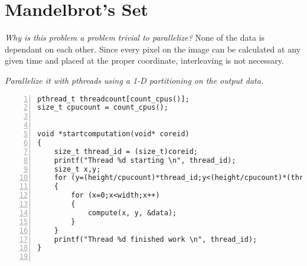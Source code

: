 \documentclass{article}
\begin{document}
\section{Mandelbrot's Set}

\begin{ExerciseList}
\Exercise
{}

\Question \emph{Why is this problem a problem trivial to parallelize?}
\Answer None of the data is dependant on each other. Since every pixel on the image can be calculated at any given time and placed at the proper coordinate, interleaving is not necessary.

\Question \emph{Parallelize it with pthreads using a 1-D partitioning on
the output data.}

\begin{lstlisting}[basicstyle=\small\sffamily,
keywords={break,case,const,continue,default,else,enum,
for,if,return,switch,while,do,long,void,int,float,double,
char,struct,typedef,include,size\_t},
keywordstyle={\color{blue}},
comment={[l]{//}}, morecomment={[s]{/*}{*/}}, commentstyle=\itshape,
columns={[l]flexible}, numbers=left, numberstyle=\tiny,
frameround=fftt, frame=shadowbox, captionpos=b,
caption={Parallelized computation of Mandelbrot's set.},
label=LST:mandelbrot1]
pthread_t threadcount[count_cpus()];
size_t cpucount = count_cpus();


void *startcomputation(void* coreid)
{
    size_t thread_id = (size_t)coreid;
	printf("Thread %d starting \n", thread_id);
    size_t x,y;
	for (y=(height/cpucount)*thread_id;y<(height/cpucount)*(thread_id +1); y++)
	{
		for (x=0;x<width;x++)
		{
			compute(x, y, &data);
		}
	}
	printf("Thread %d finished work \n", thread_id);
}


\end{lstlisting}
\end{ExerciseList}
\end{document}
